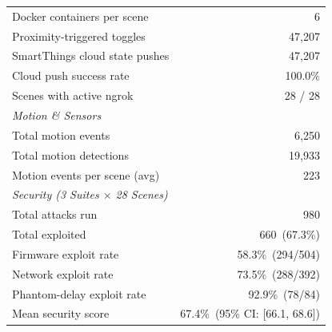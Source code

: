 \begin{table}[t]
\begin{tabular}{l r}
    \quad Docker containers per scene     & 6 \\
    \quad Proximity-triggered toggles     & 47{,}207 \\
    \quad SmartThings cloud state pushes  & 47{,}207 \\
    \quad Cloud push success rate         & 100.0\% \\
    \quad Scenes with active ngrok        & 28 / 28 \\
    \midrule
    \multicolumn{2}{l}{\textit{Motion \& Sensors}} \\
    \quad Total motion events             & 6{,}250 \\
    \quad Total motion detections         & 19{,}933 \\
    \quad Motion events per scene (avg)   & 223 \\
    \midrule
    \multicolumn{2}{l}{\textit{Security (3 Suites $\times$ 28 Scenes)}} \\
    \quad Total attacks run               & 980 \\
    \quad Total exploited                 & 660~(67.3\%) \\
    \quad Firmware exploit rate           & 58.3\%~(294/504) \\
    \quad Network exploit rate            & 73.5\%~(288/392) \\
    \quad Phantom-delay exploit rate      & 92.9\%~(78/84) \\
    \quad Mean security score             & 67.4\%~(95\% CI: [66.1, 68.6]) \\
    \bottomrule
  \end{tabular}
\end{table}
